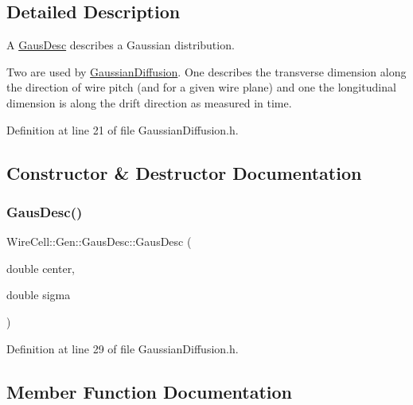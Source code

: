 \subsection{Detailed Description}
A \hyperlink{struct_wire_cell_1_1_gen_1_1_gaus_desc}{Gaus\+Desc} describes a Gaussian distribution.

Two are used by \hyperlink{class_wire_cell_1_1_gen_1_1_gaussian_diffusion}{Gaussian\+Diffusion}. One describes the transverse dimension along the direction of wire pitch (and for a given wire plane) and one the longitudinal dimension is along the drift direction as measured in time. 

Definition at line 21 of file Gaussian\+Diffusion.\+h.



\subsection{Constructor \& Destructor Documentation}
\mbox{\label{struct_wire_cell_1_1_gen_1_1_gaus_desc_a3cb2ea1d5e31b758df540cdd6cace465}} 
\subsubsection{\texorpdfstring{Gaus\+Desc()}{GausDesc()}}
{\footnotesize\ttfamily Wire\+Cell\+::\+Gen\+::\+Gaus\+Desc\+::\+Gaus\+Desc (\begin{DoxyParamCaption}\item[{double}]{center,  }\item[{double}]{sigma }\end{DoxyParamCaption})\hspace{0.3cm}{\ttfamily [inline]}}



Definition at line 29 of file Gaussian\+Diffusion.\+h.



\subsection{Member Function Documentation}
\mbox{\label{struct_wire_cell_1_1_gen_1_1_gaus_desc_a1b437283fecc3cbfcdb616179381d666}} 
